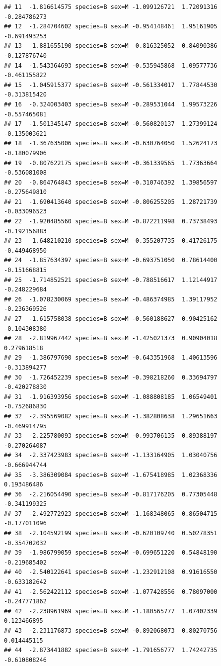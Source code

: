 \documentclass{beamer}\usepackage[]{graphicx}\usepackage[]{color}
\makeatletter
\newenvironment{kframe}{%
 \def\at@end@of@kframe{}%
 \ifinner\ifhmode%
  \def\at@end@of@kframe{\end{minipage}}%
  \begin{minipage}{\columnwidth}%
 \fi\fi%
 \def\FrameCommand##1{\hskip\@totalleftmargin \hskip-\fboxsep
 \colorbox{shadecolor}{##1}\hskip-\fboxsep
     \hskip-\linewidth \hskip-\@totalleftmargin \hskip\columnwidth}%
 \MakeFramed {\advance\hsize-\width
   \@totalleftmargin\z@ \linewidth\hsize
   \@setminipage}}%
 {\par\unskip\endMakeFramed%
 \at@end@of@kframe}
\newenvironment{knitrout}{}{} %
\makeatother
\begin{document}
\begin{frame}[fragile]
\begin{knitrout}
\begin{kframe}
\begin{verbatim}
## 11  -1.816614575 species=B sex=M -1.099126721  1.72091316    -0.284786273
## 12  -1.284704602 species=B sex=M -0.954148461  1.95161905    -0.691493253
## 13  -1.881655190 species=B sex=M -0.816325052  0.84090386    -0.127876740
## 14  -1.543364693 species=B sex=M -0.535945868  1.09577736    -0.461155822
## 15  -1.045915377 species=B sex=M -0.561334017  1.77844530    -0.313815420
## 16  -0.324003403 species=B sex=M -0.289531044  1.99573226    -0.557465081
## 17  -1.501345147 species=B sex=M -0.560820137  1.27399124    -0.135003621
## 18  -1.367635006 species=B sex=M -0.630764050  1.52624173    -0.180079906
## 19  -0.807622175 species=B sex=M -0.361339565  1.77363664    -0.536081008
## 20  -0.864764843 species=B sex=M -0.310746392  1.39856597    -0.275649810
## 21  -1.690413640 species=B sex=M -0.806255205  1.28721739    -0.033096523
## 22  -1.920485560 species=B sex=M -0.872211998  0.73738493    -0.192156883
## 23  -1.648210210 species=B sex=M -0.355207735  0.41726175    -0.449468950
## 24  -1.857634397 species=B sex=M -0.693751050  0.78614400    -0.151668815
## 25  -1.714852521 species=B sex=M -0.788516617  1.12144917    -0.248229684
## 26  -1.078230069 species=B sex=M -0.486374985  1.39117952    -0.236369526
## 27  -1.615758038 species=B sex=M -0.560188627  0.90425162    -0.104308380
## 28  -2.819967442 species=B sex=M -1.425021373  0.90904018     0.279618518
## 29  -1.386797690 species=B sex=M -0.643351968  1.40613596    -0.313894277
## 30  -1.726452239 species=B sex=M -0.398218260  0.33694797    -0.420278830
## 31  -1.916393956 species=B sex=M -1.088808185  1.06549401    -0.752686830
## 32  -2.395569082 species=B sex=M -1.382808638  1.29651663    -0.469914795
## 33  -2.225780093 species=B sex=M -0.993706135  0.89388197    -0.270264087
## 34  -2.337423983 species=B sex=M -1.133164905  1.03040756    -0.666944744
## 35  -3.386309084 species=B sex=M -1.675418985  1.02368336     0.193486486
## 36  -2.216054490 species=B sex=M -0.817176205  0.77305448    -0.341199325
## 37  -2.492772923 species=B sex=M -1.168348065  0.86504715    -0.177011096
## 38  -2.104592199 species=B sex=M -0.620109740  0.50278351    -0.354702032
## 39  -1.986799059 species=B sex=M -0.699651220  0.54848190    -0.219685402
## 40  -2.540122641 species=B sex=M -1.232912108  0.91616550    -0.633182642
## 41  -2.562422112 species=B sex=M -1.077428556  0.78097000    -0.247771862
## 42  -2.238961969 species=B sex=M -1.180565777  1.07402339     0.123466895
## 43  -2.231176873 species=B sex=M -0.892068073  0.80270756     0.014445115
## 44  -2.873441882 species=B sex=M -1.791656777  1.74242735    -0.610808246

\end{verbatim}
\end{kframe}
\end{knitrout}
\end{frame}
\end{document}
